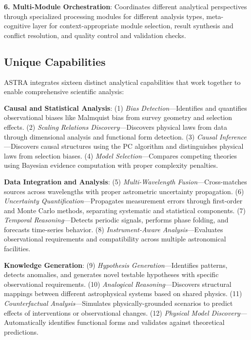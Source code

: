 \documentclass[usenatbib]{rasti}
\begin{document}
\textbf{6. Multi-Module Orchestration}: Coordinates different analytical perspectives through specialized processing modules for different analysis types, meta-cognitive layer for context-appropriate module selection, result synthesis and conflict resolution, and quality control and validation checks.

\subsection{Unique Capabilities}

ASTRA integrates sixteen distinct analytical capabilities that work together to enable comprehensive scientific analysis:

\textbf{Causal and Statistical Analysis}: (1) \textit{Bias Detection}---Identifies and quantifies observational biases like Malmquist bias from survey geometry and selection effects. (2) \textit{Scaling Relations Discovery}---Discovers physical laws from data through dimensional analysis and functional form detection. (3) \textit{Causal Inference}---Discovers causal structures using the PC algorithm and distinguishes physical laws from selection biases. (4) \textit{Model Selection}---Compares competing theories using Bayesian evidence computation with proper complexity penalties.

\textbf{Data Integration and Analysis}: (5) \textit{Multi-Wavelength Fusion}---Cross-matches sources across wavelengths with proper astrometric uncertainty propagation. (6) \textit{Uncertainty Quantification}---Propagates measurement errors through first-order and Monte Carlo methods, separating systematic and statistical components. (7) \textit{Temporal Reasoning}---Detects periodic signals, performs phase folding, and forecasts time-series behavior. (8) \textit{Instrument-Aware Analysis}---Evaluates observational requirements and compatibility across multiple astronomical facilities.

\textbf{Knowledge Generation}: (9) \textit{Hypothesis Generation}---Identifies patterns, detects anomalies, and generates novel testable hypotheses with specific observational requirements. (10) \textit{Analogical Reasoning}---Discovers structural mappings between different astrophysical systems based on shared physics. (11) \textit{Counterfactual Analysis}---Simulates physically-grounded scenarios to predict effects of interventions or observational changes. (12) \textit{Physical Model Discovery}---Automatically identifies functional forms and validates against theoretical predictions.
\end{document}
